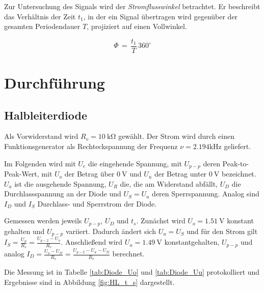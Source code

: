 \documentclass[10pt,a4paper]{scrartcl}
\begin{document}
Zur Untersuchung des Signals wird der \emph{Stromflusswinkel} betrachtet.
Er beschreibt das Verhältnis der Zeit $t_1$,
in der ein Signal übertragen wird gegenüber der gesamten Periodendauer $T$,
projiziert auf einen Vollwinkel.

\begin{equation}
    \Phi\,=\,\frac{t_1}{T}\,360^\circ
\end{equation}

\section {Durchführung}

\subsection {Halbleiterdiode}

Als Vorwiderstand wird $R_v=10~\mathrm{k\Omega}$ gewählt.
Der Strom wird durch einen Funktionsgenerator als Rechteckspannung der
Frequenz $\nu=2.194\mathrm{kHz}$ geliefert.

Im Folgenden wird mit $U_e$ die eingehende Spannung, mit $U_{p-p}$ deren
Peak-to-Peak-Wert, mit $U_o$ der Betrag über $0~\mathrm V$ und $U_u$ der
Betrag unter $0~\mathrm V$ bezeichnet.
$U_a$ ist die ausgehende Spannung, $U_R$ die, die am Widerstand abfällt,
$U_D$ die Durchlassspannung an der Diode und $U_S=U_u$ deren Sperrspannung.
Analog sind $I_D$ und $I_S$ Durchlass- und Sperrstrom der Diode.

Gemessen werden jeweils $U_{p-p}$, $U_D$ und $t_s$.
Zunächst wird $U_o=1.51~\mathrm V$ konstant gehalten und $U_{p-p}$ variiert.
Dadurch ändert sich $U_u=U_S$ und für den Strom gilt
$I_S=\frac{U_S}{R_v}=\frac{U_{p-2}-U_o}{R_v}$.
Anschließend wird $U_u=1.49~\mathrm V$ konstantgehalten, $U_{p-p}$ und
analog $I_D=\frac{U_o-U_D}{R_v}=\frac{U_{p-2}-U_u-U_D}{R_v}$ berechnet.

Die Messung ist in Tabelle \ref{tab:Diode_Uo} und \ref{tab:Diode_Uu}
protokolliert und Ergebnisse sind in Abbildung \ref{fig:HL_t_s} dargestellt.
\end{document}
